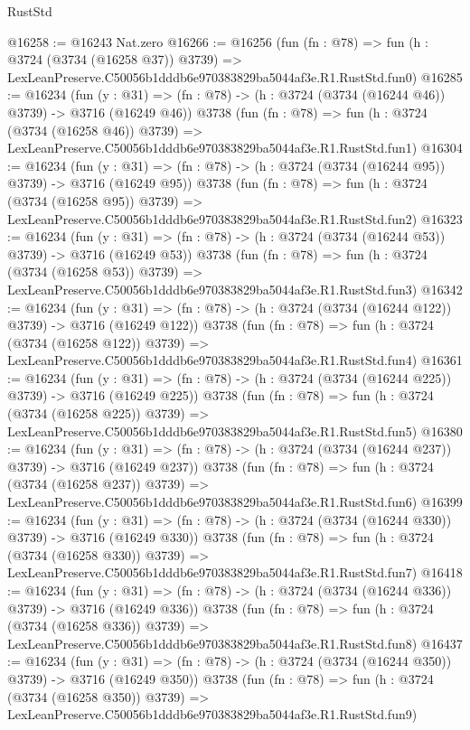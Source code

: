 \begin{lexlean}{RustStd}
\begin{coremodule}
@16258 := @16243 Nat.zero
@16266 := @16256
    (fun (fn : @78) =>
    fun (h : @3724 (@3734 (@16258 @37)) @3739) =>
    LexLeanPreserve.C50056b1dddb6e970383829ba5044af3e.R1.RustStd.fun0)
@16285 := @16234
    (fun (y : @31) => (fn : @78) -> (h : @3724 (@3734 (@16244 @46)) @3739) -> @3716 (@16249 @46))
    @3738
    (fun (fn : @78) =>
    fun (h : @3724 (@3734 (@16258 @46)) @3739) =>
    LexLeanPreserve.C50056b1dddb6e970383829ba5044af3e.R1.RustStd.fun1)
@16304 := @16234
    (fun (y : @31) => (fn : @78) -> (h : @3724 (@3734 (@16244 @95)) @3739) -> @3716 (@16249 @95))
    @3738
    (fun (fn : @78) =>
    fun (h : @3724 (@3734 (@16258 @95)) @3739) =>
    LexLeanPreserve.C50056b1dddb6e970383829ba5044af3e.R1.RustStd.fun2)
@16323 := @16234
    (fun (y : @31) => (fn : @78) -> (h : @3724 (@3734 (@16244 @53)) @3739) -> @3716 (@16249 @53))
    @3738
    (fun (fn : @78) =>
    fun (h : @3724 (@3734 (@16258 @53)) @3739) =>
    LexLeanPreserve.C50056b1dddb6e970383829ba5044af3e.R1.RustStd.fun3)
@16342 := @16234
    (fun (y : @31) => (fn : @78) -> (h : @3724 (@3734 (@16244 @122)) @3739) -> @3716 (@16249 @122))
    @3738
    (fun (fn : @78) =>
    fun (h : @3724 (@3734 (@16258 @122)) @3739) =>
    LexLeanPreserve.C50056b1dddb6e970383829ba5044af3e.R1.RustStd.fun4)
@16361 := @16234
    (fun (y : @31) => (fn : @78) -> (h : @3724 (@3734 (@16244 @225)) @3739) -> @3716 (@16249 @225))
    @3738
    (fun (fn : @78) =>
    fun (h : @3724 (@3734 (@16258 @225)) @3739) =>
    LexLeanPreserve.C50056b1dddb6e970383829ba5044af3e.R1.RustStd.fun5)
@16380 := @16234
    (fun (y : @31) => (fn : @78) -> (h : @3724 (@3734 (@16244 @237)) @3739) -> @3716 (@16249 @237))
    @3738
    (fun (fn : @78) =>
    fun (h : @3724 (@3734 (@16258 @237)) @3739) =>
    LexLeanPreserve.C50056b1dddb6e970383829ba5044af3e.R1.RustStd.fun6)
@16399 := @16234
    (fun (y : @31) => (fn : @78) -> (h : @3724 (@3734 (@16244 @330)) @3739) -> @3716 (@16249 @330))
    @3738
    (fun (fn : @78) =>
    fun (h : @3724 (@3734 (@16258 @330)) @3739) =>
    LexLeanPreserve.C50056b1dddb6e970383829ba5044af3e.R1.RustStd.fun7)
@16418 := @16234
    (fun (y : @31) => (fn : @78) -> (h : @3724 (@3734 (@16244 @336)) @3739) -> @3716 (@16249 @336))
    @3738
    (fun (fn : @78) =>
    fun (h : @3724 (@3734 (@16258 @336)) @3739) =>
    LexLeanPreserve.C50056b1dddb6e970383829ba5044af3e.R1.RustStd.fun8)
@16437 := @16234
    (fun (y : @31) => (fn : @78) -> (h : @3724 (@3734 (@16244 @350)) @3739) -> @3716 (@16249 @350))
    @3738
    (fun (fn : @78) =>
    fun (h : @3724 (@3734 (@16258 @350)) @3739) =>
    LexLeanPreserve.C50056b1dddb6e970383829ba5044af3e.R1.RustStd.fun9)

\end{coremodule}
\end{lexlean}
